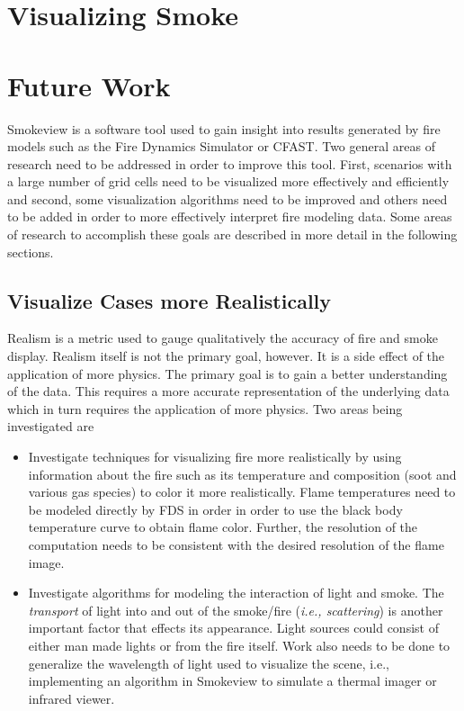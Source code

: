 \documentclass[11pt,twoside]{book}
\begin{document}
%
%

\chapter{Visualizing Smoke}

\newcommand{\citesmv}{\cite{Smokeview_Users_Guide}}
\newcommand{\paper}{chapter}

%
%

\chapter{Future Work}

Smokeview is a software tool used to gain insight into results
generated by fire models such as the Fire Dynamics Simulator or
CFAST. Two general areas of research need to be addressed in order
to improve this tool. First, scenarios with a large number of grid
cells need to be visualized more effectively and efficiently and
second, some visualization algorithms need to be improved and
others need to be added in order to more effectively interpret
fire modeling data. Some areas of research to accomplish these
goals are described in more detail in the following sections.

%
%

\section{Visualize Cases more Realistically}
Realism is a metric used to gauge qualitatively the accuracy of
fire and smoke display. Realism itself is not the primary goal,
however.  It is a side effect of the application of more physics.
The primary goal is to gain a better understanding of the data.
This requires a more accurate representation of the underlying
data which in turn requires the application of more physics.  Two
areas being investigated are
\begin{itemize}
\item Investigate techniques for visualizing fire more
realistically by using information about the fire such as its
temperature and composition (soot and various gas species) to
color it more realistically.  Flame temperatures need to be
modeled directly by FDS in order in order to use the black body
temperature curve to obtain flame color.  Further, the resolution
of the computation needs to be consistent with the desired
resolution of the flame image.

\item Investigate algorithms for modeling the interaction of light
and smoke. The {\em transport} of light into and out of the
smoke/fire ({\em i.e., scattering}) is another important factor
that effects its appearance.  Light sources could consist of
either man made lights or from the fire itself.  Work also needs
to be done to generalize the wavelength of light used to visualize
the scene, i.e., implementing an algorithm in Smokeview to
simulate a thermal imager or infrared viewer.
\end{itemize}
\end{document}
